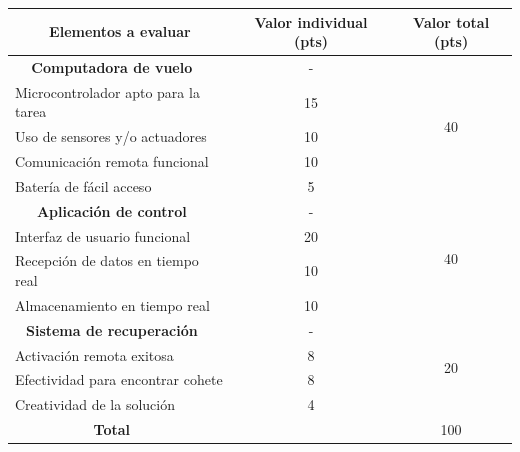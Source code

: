 ﻿\documentclass[letterpaper]{article}
\begin{document}
\begin{table}[h]
    \centering
    \begin{tabular}{cccc}
        \toprule
        \multicolumn{2}{c}{Elementos a evaluar} & Valor individual (pts) & Valor total (pts) \\
        \midrule
        \bf{Computadora de vuelo} & & - & \multirow{5}{*}{40} \\
        \multicolumn{2}{l}{Microcontrolador apto para la tarea} & 15 & \\
        \multicolumn{2}{l}{Uso de sensores y/o actuadores}      & 10 & \\
        \multicolumn{2}{l}{Comunicación remota funcional}       & 10 & \\
        \multicolumn{2}{l}{Batería de fácil acceso}             & 5 & \\
        \midrule
        \bf{Aplicación de control} & & - & \multirow{4}{*}{40} \\
        \multicolumn{2}{l}{Interfaz de usuario funcional}       & 20 & \\
        \multicolumn{2}{l}{Recepción de datos en tiempo real}   & 10 & \\
        \multicolumn{2}{l}{Almacenamiento en tiempo real}       & 10 & \\
        \midrule
        \bf{Sistema de recuperación} & & - & \multirow{4}{*}{20} \\
        \multicolumn{2}{l}{Activación remota exitosa}           & 8 & \\
        \multicolumn{2}{l}{Efectividad para encontrar cohete}   & 8 & \\
        \multicolumn{2}{l}{Creatividad de la solución}          & 4 & \\
        \midrule
        \bf{Total} & & & 100 \\
        \bottomrule
    \end{tabular}
\end{table}

\clearpage
\end{document}
